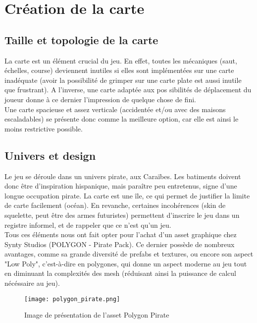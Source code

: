 \documentclass[../doc.tex]{subfiles}
\begin{document}
    \section{Création de la carte}

    \subsection{Taille et topologie de la carte}
    
    La carte est un élément crucial du jeu. En effet, toutes les mécaniques 
    (saut, échelles, course)
    deviennent inutiles si elles sont implémentées sur une carte inadéquate (avoir la 
    possibilité de grimper sur une carte plate est aussi inutile que frustrant).
    A l'inverse, une carte adaptée aux pos
    sibilités de déplacement du joueur donne à ce dernier
    l'impression de quelque chose de fini.
    \\

    Une carte spacieuse et assez verticale (accidentée et/ou avec des maisons escaladables)
    se présente donc comme la meilleure option, car elle est ainsi le moins restrictive possible.

    \subsection{Univers et design}

    Le jeu se déroule dans un univers pirate, aux Caraïbes.
    Les batiments doivent donc être d'inspiration hispanique,
    mais paraître peu entretenus, signe d'une longue occupation 
    pirate. La carte est une île, ce qui permet de justifier
    la limite de carte facilement (océan). En revanche, certaines 
    incohérences (skin de squelette, peut être des armes futuristes)
    permettent d'inscrire le jeu dans un registre informel, et de 
    rappeler que ce n'est qu'un jeu.
    \\

    Tous ces éléments nous ont fait opter pour l'achat d'un asset graphique chez 
    Synty Studios (POLYGON - Pirate Pack).
    Ce dernier possède de nombreux avantages, comme sa grande diversité de prefabs et 
    textures, ou encore son aspect "Low Poly", 
    c'est-à-dire en polygones, qui donne un aspect moderne au jeu tout en diminuant la 
    complexités des mesh (réduisant ainsi la 
    puissance de calcul nécéssaire au jeu).
    \\ 

    \begin{figure}[!ht]
        \centering
        \texttt{[image: polygon\_pirate.png]}
        \caption{Image de présentation de l'asset Polygon Pirate}
    \end{figure}
        

    
    
\end{document}
